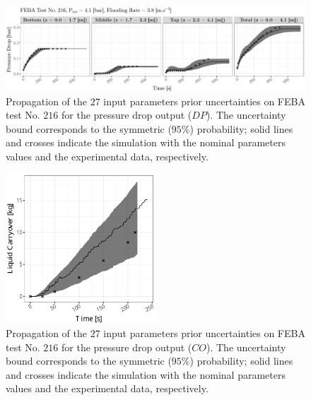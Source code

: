 \begin{figure}[bth]
    \centering
    \includegraphics[width=1.0\textwidth]{../figures/chapter2/figures/plotTraceUQPriorDP216}
    \caption[Propagation of the $27$ input parameters prior uncertainties on FEBA test No. $216$ for the pressure drop output ($DP$).]{Propagation of the $27$ input parameters prior uncertainties on FEBA test No. $216$ for the pressure drop output ($DP$). The uncertainty bound corresponds to the symmetric ($95\%$) probability; solid lines and crosses indicate the simulation with the nominal parameters values and the experimental data, respectively.}
    \label{fig:ch2_plot_trace_uq_prior_dp_216}
\end{figure}

\begin{figure}[!bth]
    \centering
    \includegraphics[width=0.5\textwidth]{../figures/chapter2/figures/plotTraceUQPriorCO216}
    \caption[Propagation of the $27$ input parameters prior uncertainties on FEBA test No. $216$ for the liquid carryover output ($CO$).]{Propagation of the $27$ input parameters prior uncertainties on FEBA test No. $216$ for the pressure drop output ($CO$). The uncertainty bound corresponds to the symmetric ($95\%$) probability; solid lines and crosses indicate the simulation with the nominal parameters values and the experimental data, respectively.}
    \label{fig:ch2_plot_trace_uq_prior_co_216}
\end{figure}